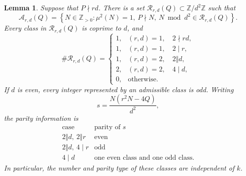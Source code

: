 \documentclass[12pt,reqno]{amsart}
\numberwithin{equation}{section}
\theoremstyle{plain}
\newtheorem{lemma}[theorem]{Lemma}
\theoremstyle{definition}
\theoremstyle{remark}
\begin{document}
\begin{lemma}\label{lem:admissible-classes}
Suppose that $P\nmid rd$.  There is a set
$\mathcal R_{r,d}(Q)\subset\mathbb Z/d^2\mathbb Z$ such that
\[
\mathcal A_{r,d}(Q)
=
\left\{
N\in\mathbb Z_{>0}:
\mu^2(N)=1,\ P\nmid N,\
N\bmod d^2\in\mathcal R_{r,d}(Q)
\right\}.
\]
Every class in $\mathcal R_{r,d}(Q)$ is coprime to $d$, and
\[
\#\mathcal R_{r,d}(Q)
=
\begin{cases}
1,&(r,d)=1,\quad 2\nmid rd,\\
1,&(r,d)=1,\quad 2\mid r,\\
1,&(r,d)=2,\quad 2\Vert d,\\
2,&(r,d)=2,\quad 4\mid d,\\
0,&\text{otherwise}.
\end{cases}
\]
If $d$ is even, every integer represented by an admissible class is odd.
Writing
\[
s=\frac{N(r^2N-4Q)}{d^2},
\]
the parity information is
\[
\begin{array}{c|c}
\text{case}&\text{parity of }s\\ \hline
2\Vert d,\ 2\Vert r&\text{even}\\
2\Vert d,\ 4\mid r&\text{odd}\\
4\mid d&\text{one even class and one odd class}.
\end{array}
\]
In particular, the number and parity type of these classes are independent of $k$.
\end{lemma}
\end{document}
